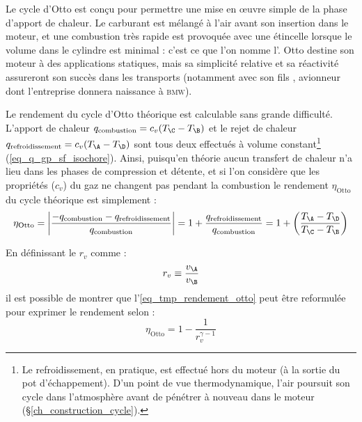 		Le cycle d’Otto est conçu pour permettre une mise en œuvre simple de la phase d’apport de chaleur. Le carburant est mélangé à l’air avant son insertion dans le moteur, et une combustion très rapide est provoquée avec une étincelle lorsque le volume dans le cylindre est minimal : c’est ce que l’on nomme l’. Otto destine son moteur à des applications statiques, mais sa simplicité relative et sa réactivité assureront son succès dans les transports (notamment avec son fils , avionneur dont l’entreprise donnera naissance à \textsc{bmw}).

		Le rendement du cycle d’Otto théorique est calculable sans grande difficulté. L’apport de chaleur $q_\text{combustion} = c_v (T_\C - T_\B )$ et le rejet de chaleur $q_\text{refroidissement} = c_v (T_\A - T_\D)$ sont tous deux effectués à volume constant\footnote{Le refroidissement, en pratique, est effectué hors du moteur (à la sortie du pot d’échappement). D’un point de vue thermodynamique, l’air poursuit son cycle dans l’atmosphère avant de pénétrer à nouveau dans le moteur (\S\ref{ch_construction_cycle}).} (\ref{eq_q_gp_sf_isochore}). Ainsi, puisqu’en théorie aucun transfert de chaleur n’a lieu dans les phases de compression et détente, et si l’on considère que les propriétés ($c_v$) du gaz ne changent pas pendant la combustion le rendement $\eta_\text{Otto}$ du cycle théorique est simplement :
		\begin{equation}
			\eta_\text{Otto} = \left| \frac{-q_\text{combustion} - q_\text{refroidissement}}{q_\text{combustion}} \right| = 1 + \frac{q_\text{refroidissement}}{q_\text{combustion}} = 1 + \left( \frac{T_\A - T_\D}{T_\C - T_\B } \right) \label{eq_tmp_rendement_otto}
		\end{equation}

		En définissant le  $r_v$ comme :
		\begin{equation}
			r_v \equiv  \frac{v_\A}{v_\B}
		\end{equation}
		il est possible de montrer que l’\cref{eq_tmp_rendement_otto} peut être reformulée pour exprimer le rendement selon :
		\begin{equation}
			\eta_\text{Otto} = 1 - \frac{1}{r_v^{\gamma -1}}
		\end{equation}

